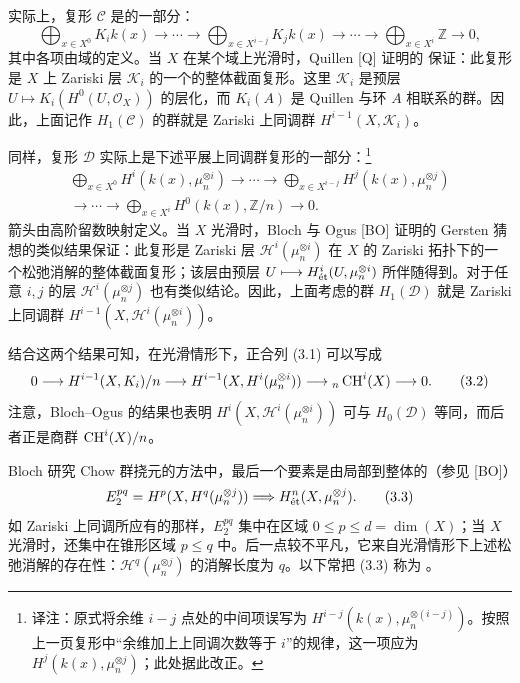 实际上，复形 $\mathcal C$ 是的一部分：
\[
\bigoplus_{x\in X^0}K_i k(x)\longrightarrow\cdots\longrightarrow\bigoplus_{x\in X^{i-j}}K_j k(x)\longrightarrow\cdots\longrightarrow\bigoplus_{x\in X^i}\mathbb Z\longrightarrow0,
\]
其中各项由域的定义。当 $X$ 在某个域上光滑时，Quillen [Q] 证明的 保证：此复形是 $X$ 上 Zariski 层 $\mathcal K_i$ 的一个的整体截面复形。这里 $\mathcal K_i$ 是预层 $U\longmapsto K_i(H^0(U,\mathcal O_X))$ 的层化，而 $K_i(A)$ 是 Quillen 与环 $A$ 相联系的群。因此，上面记作 $H_1(\mathcal C)$ 的群就是 Zariski 上同调群 $H^{i-1}(X,\mathcal K_i)$。

同样，复形 $\mathcal D$ 实际上是下述平展上同调群复形的一部分：\footnote{译注：原式将余维 $i-j$ 点处的中间项误写为 $H^{i-j}(k(x),\mu_n^{\otimes(i-j)})$。按照上一页复形中“余维加上上同调次数等于 $i$”的规律，这一项应为 $H^j(k(x),\mu_n^{\otimes j})$；此处据此改正。}
\[
\begin{split}
\bigoplus_{x\in X^0}H^i(k(x),\mu_n^{\otimes i})\longrightarrow\cdots
\longrightarrow\bigoplus_{x\in X^{i-j}}H^j(k(x),\mu_n^{\otimes j})\\
\longrightarrow\cdots\longrightarrow\bigoplus_{x\in X^i}H^0(k(x),\mathbb Z/n)\longrightarrow0.
\end{split}
\]
箭头由高阶留数映射定义。当 $X$ 光滑时，Bloch 与 Ogus [BO] 证明的 Gersten 猜想的类似结果保证：此复形是 Zariski 层 $\mathcal H^i(\mu_n^{\otimes i})$ 在 $X$ 的 Zariski 拓扑下的一个松弛消解的整体截面复形；该层由预层 $U\longmapsto H^i_{\mathrm{\acute et}}(U,\mu_n^{\otimes i})$ 所伴随得到。对于任意 $i,j$ 的层 $\mathcal H^i(\mu_n^{\otimes j})$ 也有类似结论。因此，上面考虑的群 $H_1(\mathcal D)$ 就是 Zariski 上同调群 $H^{i-1}(X,\mathcal H^i(\mu_n^{\otimes i}))$。

结合这两个结果可知，在光滑情形下，正合列 (3.1) 可以写成
\begin{equation*}
0\longrightarrow H^{i-1}(X,K_i)/n\longrightarrow H^{i-1}(X,H^i(\mu_n^{\otimes i}))\longrightarrow{}_n\operatorname{CH}^i(X)\longrightarrow0.\tag{3.2}
\end{equation*}
注意，Bloch--Ogus 的结果也表明 $H^i(X,\mathcal H^i(\mu_n^{\otimes i}))$ 可与 $H_0(\mathcal D)$ 等同，而后者正是商群 $\operatorname{CH}^i(X)/n$。

Bloch 研究 Chow 群挠元的方法中，最后一个要素是由局部到整体的（参见 [BO]）
\begin{equation*}
E_2^{pq}=H^p(X,H^q(\mu_n^{\otimes j}))\Longrightarrow H^n_{\mathrm{\acute et}}(X,\mu_n^{\otimes j}).\tag{3.3}
\end{equation*}
如 Zariski 上同调所应有的那样，$E_2^{pq}$ 集中在区域 $0\le p\le d=\dim(X)$；当 $X$ 光滑时，还集中在锥形区域 $p\le q$ 中。后一点较不平凡，它来自光滑情形下上述松弛消解的存在性：$\mathcal H^q(\mu_n^{\otimes j})$ 的消解长度为 $q$。以下常把 (3.3) 称为 。

